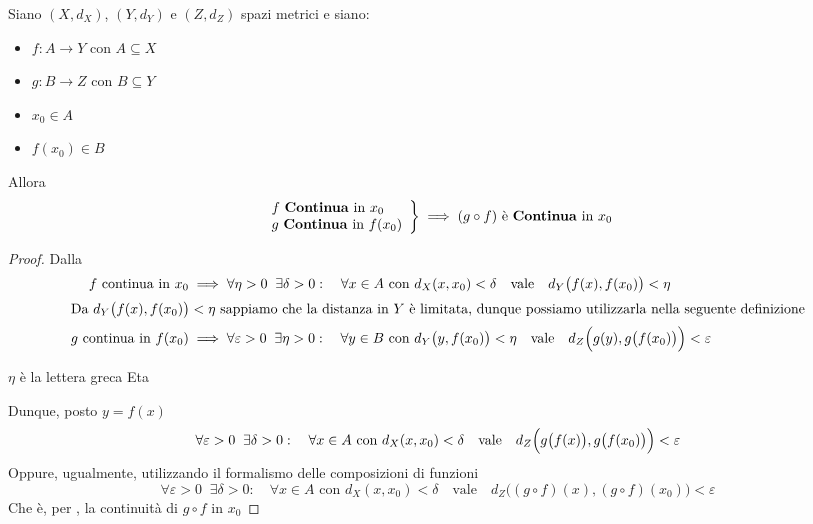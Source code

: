 \begin{proposition}
	Siano $(X,d_X)$, $(Y,d_Y)$ e $(Z,d_Z)$ spazi metrici e siano:
	\begin{itemize}[noitemsep]
		\item $f: A \to Y$ con $A \subseteq X$
		\item $g: B \to Z$ con $B \subseteq Y$
		\item $x_0 \in A$
		\item $f(x_0) \in B$
	\end{itemize}
	Allora
	\begin{equation*}
		\left.
		\begin{array}{l}
			f \text{ \textbf{Continua} in } x_0\\
			g \text{ \textbf{Continua} in } f(x_0)
		\end{array}
		\right\} \implies
		(g \circ f) \text{ è \textbf{Continua} in } x_0
	\end{equation*}
	\begin{proof}
		Dalla 
		\begin{align*}
			f \text{ continua in } x_0 &\implies \forall \eta > 0\;\;\exists \delta > 0:\quad \forall x \in A \text{ con } d_X(x,x_0) < \delta \quad \text{vale} \quad d_Y \bigl(f(x),f(x_0)\bigr) < \eta\\
			\shortintertext{Da $d_Y \bigl(f(x),f(x_0)\bigr) < \eta$ sappiamo che la distanza in $Y$ è limitata, dunque possiamo utilizzarla nella seguente definizione}
			g \text{ continua in } f(x_0) &\implies \forall \varepsilon > 0\;\;\exists \eta > 0:\quad \forall y \in B \text{ con } d_Y\bigl(y,f(x_0)\bigr) < \eta \quad \text{vale} \quad d_Z \Bigl( g(y), g \bigl( f(x_0) \bigr) \Bigr) < \varepsilon
		\end{align*}
		\vspace*{-\baselineskip}
		\begin{note}
			$\eta$ è la lettera greca Eta
		\end{note}
		Dunque, posto $y = f(x)$
		\begin{equation*}
			\forall \varepsilon > 0\;\;\exists \delta > 0:\quad \forall x \in A \text{ con } d_X(x,x_0) < \delta \quad \text{vale} \quad d_Z \Bigl( g \bigl( f(x) \bigr), g \bigl( f(x_0) \bigr) \Bigr) < \varepsilon
		\end{equation*}
		Oppure, ugualmente, utilizzando il formalismo delle composizioni di funzioni
		\begin{equation*}
			\forall \varepsilon > 0\;\;\exists \delta > 0:\quad \forall x \in A \text{ con } d_X(x,x_0) < \delta \quad \text{vale} \quad d_Z \bigl( (g \circ f)(x), (g \circ f)(x_0) \bigr) < \varepsilon
		\end{equation*}
		Che è, per , la continuità di $g \circ f$ in $x_0$
	\end{proof}
\end{proposition}


